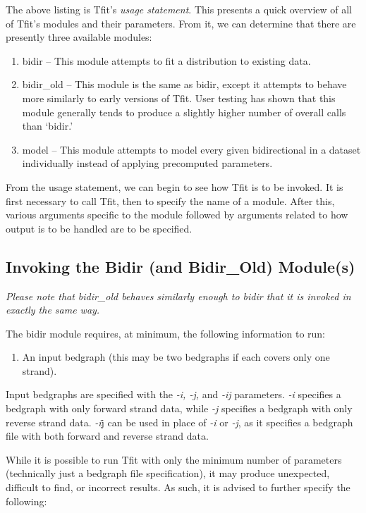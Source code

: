 \documentclass[12pt,letterpaper]{article}
\begin{document}
The above listing is Tfit's \textit{usage statement}. This presents a quick overview of all of Tfit's modules and their parameters. From it, we can determine that there are presently three available modules:
\begin{enumerate}
\item bidir -- This module attempts to fit a distribution to existing data.
\item bidir\_old -- This module is the same as bidir, except it attempts to behave more similarly to early versions of Tfit. User testing has shown that this module generally tends to produce a slightly higher number of overall calls than `bidir.'
\item model -- This module attempts to model every given bidirectional in a dataset individually instead of applying precomputed parameters.
\end{enumerate}

From the usage statement, we can begin to see how Tfit is to be invoked. It is first necessary to call Tfit, then to specify the name of a module. After this, various arguments specific to the module followed by arguments related to how output is to be handled are to be specified. 

\subsection{Invoking the Bidir (and Bidir\_Old) Module(s)}
\textit{Please note that bidir\_old behaves similarly enough to bidir that it is invoked in exactly the same way.}

The bidir module requires, at minimum, the following information to run:
\begin{enumerate}
\item An input bedgraph (this may be two bedgraphs if each covers only one strand).
\end{enumerate}

Input bedgraphs are specified with the \textit{-i, -j,} and \textit{-ij} parameters. \textit{-i} specifies a bedgraph with only forward strand data, while \textit{-j} specifies a bedgraph with only reverse strand data. \textit{-i}j can be used in place of \textit{-i} or \textit{-j}, as it specifies a bedgraph file with both forward and reverse strand data.

While it is possible to run Tfit with only the minimum number of parameters (technically just a bedgraph file specification), it may produce unexpected, difficult to find, or incorrect results. As such, it is advised to further specify the following:
\end{document}
